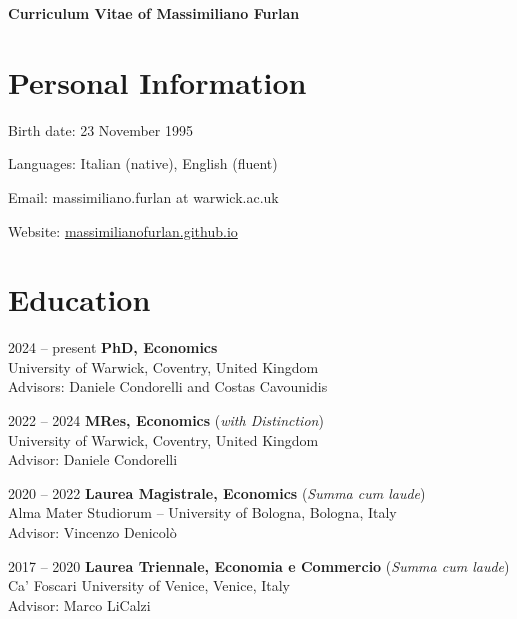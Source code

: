 \documentclass[11pt,a4paper]{article}
\begin{document}
\date{}
\thispagestyle{empty}

\begin{flushleft}
    {\huge \textbf{Curriculum Vitae of Massimiliano Furlan}}
\end{flushleft}

\section{Personal Information}

\begin{cvenumerate}[itemsep=-2pt]
    \item[Birth date:] 23 November 1995
    \item[Languages:] Italian (native), English (fluent)
    \item[Email:] massimiliano.furlan at warwick.ac.uk
    \item[Website:] \href{https://massimilianofurlan.github.io}{massimilianofurlan.github.io}
\end{cvenumerate}

\section{Education}

\begin{cvenumerate}
    \item[2024  --  present] \textbf{PhD, Economics}\\[-2pt]
        University of Warwick, Coventry, United Kingdom\\
        Advisors: Daniele Condorelli and Costas Cavounidis
    \item[2022  --  2024] \textbf{MRes, Economics} (\textit{with Distinction})\\[-2pt]
        University of Warwick, Coventry, United Kingdom\\
        Advisor: Daniele Condorelli
    \item[2020  --  2022] \textbf{Laurea Magistrale, Economics} (\textit{Summa cum laude})\\[-2pt]
        Alma Mater Studiorum  --  University of Bologna, Bologna, Italy\\[0pt]
        Advisor: Vincenzo Denicolò
    \item[2017  --  2020] \textbf{Laurea Triennale, Economia e Commercio} (\textit{Summa cum laude})\\[-2pt]
        Ca' Foscari University of Venice, Venice, Italy\\
        Advisor: Marco LiCalzi
\end{cvenumerate}
\end{document}

